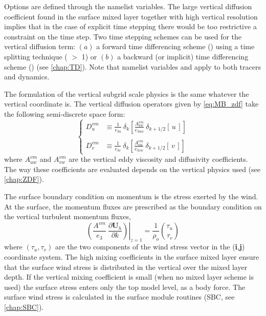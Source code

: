 \documentclass[../main/NEMO_manual]{subfiles}
\begin{document}
Options are defined through the  namelist variables.
The large vertical diffusion coefficient found in the surface mixed layer together with high vertical resolution implies that in the case of explicit time stepping there would be too restrictive a constraint on the time step.
Two time stepping schemes can be used for the vertical diffusion term:
$(a)$ a forward time differencing scheme
() using a time splitting technique ( $>$ 1) or
$(b)$ a backward (or implicit) time differencing scheme ()
(see \autoref{chap:TD}).
Note that namelist variables  and  apply to both tracers and dynamics.

The formulation of the vertical subgrid scale physics is the same whatever the vertical coordinate is.
The vertical diffusion operators given by \autoref{eq:MB_zdf} take the following semi-discrete space form:
\[
  \left\{
    \begin{aligned}
      D_u^{vm} &\equiv \frac{1}{e_{3u}} \ \delta_k \left[ \frac{A_{uw}^{vm} }{e_{3uw} }
        \ \delta_{k+1/2} [\,u\,]         \right]     \\
      \\
      D_v^{vm} &\equiv \frac{1}{e_{3v}} \ \delta_k \left[ \frac{A_{vw}^{vm} }{e_{3vw} }
        \ \delta_{k+1/2} [\,v\,]         \right]
    \end{aligned}
  \right.
\]
where $A_{uw}^{vm} $ and $A_{vw}^{vm} $ are the vertical eddy viscosity and diffusivity coefficients.
The way these coefficients are evaluated depends on the vertical physics used (see \autoref{chap:ZDF}).

The surface boundary condition on momentum is the stress exerted by the wind.
At the surface, the momentum fluxes are prescribed as the boundary condition on
the vertical turbulent momentum fluxes,
\begin{equation}
  \label{eq:DYN_zdf_sbc}
  \left.{\left( {\frac{A^{vm} }{e_3 }\ \frac{\partial \textbf{U}_h}{\partial k}} \right)} \right|_{z=1}
  = \frac{1}{\rho_o} \binom{\tau_u}{\tau_v }
\end{equation}
where $\left( \tau_u ,\tau_v \right)$ are the two components of the wind stress vector in
the (\textbf{i},\textbf{j}) coordinate system.
The high mixing coefficients in the surface mixed layer ensure that the surface wind stress is distributed in
the vertical over the mixed layer depth.
If the vertical mixing coefficient is small (when no mixed layer scheme is used)
the surface stress enters only the top model level, as a body force.
The surface wind stress is calculated in the surface module routines (SBC, see \autoref{chap:SBC}).
\end{document}
